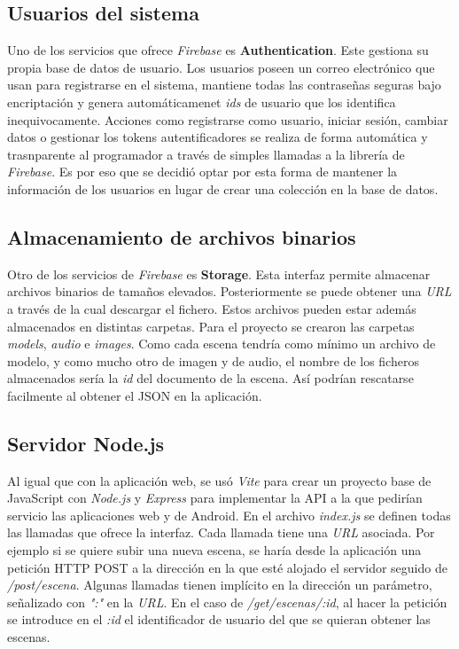 \subsection{Usuarios del sistema}

Uno de los servicios que ofrece \textit{Firebase} es \textbf{Authentication}. Este gestiona su propia base de datos de usuario. Los usuarios poseen un correo electrónico que usan para registrarse en el sistema, mantiene todas las contraseñas seguras bajo encriptación y genera automáticamenet \textit{ids} de usuario que los identifica inequivocamente. Acciones como registrarse como usuario, iniciar sesión, cambiar datos o gestionar los tokens autentificadores se realiza de forma automática y trasnparente al programador a través de simples llamadas a la librería de \textit{Firebase}. Es por eso que se decidió optar por esta forma de mantener la información de los usuarios en lugar de crear una colección en la base de datos.

\subsection{Almacenamiento de archivos binarios}

Otro de los servicios de \textit{Firebase} es \textbf{Storage}. Esta interfaz permite almacenar archivos binarios de tamaños elevados. Posteriormente se puede obtener una \textit{URL} a través de la cual descargar el fichero. Estos archivos pueden estar además almacenados en distintas carpetas. Para el proyecto se crearon las carpetas \textit{models}, \textit{audio} e \textit{images}. Como cada escena tendría como mínimo un archivo de modelo, y como mucho otro de imagen y de audio, el nombre de los ficheros almacenados sería la \textit{id} del documento de la escena. Así podrían rescatarse facilmente al obtener el JSON en la aplicación.

\subsection{Servidor Node.js}

Al igual que con la aplicación web, se usó \textit{Vite} para crear un proyecto base de JavaScript con \textit{Node.js}\cite{nodejs} y \textit{Express}\cite{express} para implementar la API a la que pedirían servicio las aplicaciones web y de Android. En el archivo \textit{index.js} se definen todas las llamadas que ofrece la interfaz. Cada llamada tiene una \textit{URL} asociada. Por ejemplo si se quiere subir una nueva escena, se haría desde la aplicación una petición HTTP POST a la dirección en la que esté alojado el servidor seguido de \textit{/post/escena}. Algunas llamadas tienen implícito en la dirección un parámetro, señalizado con \textit{":"} en la \textit{URL}. En el caso de \textit{/get/escenas/:id}, al hacer la petición se introduce en el \textit{:id} el identificador de usuario del que se quieran obtener las escenas.

